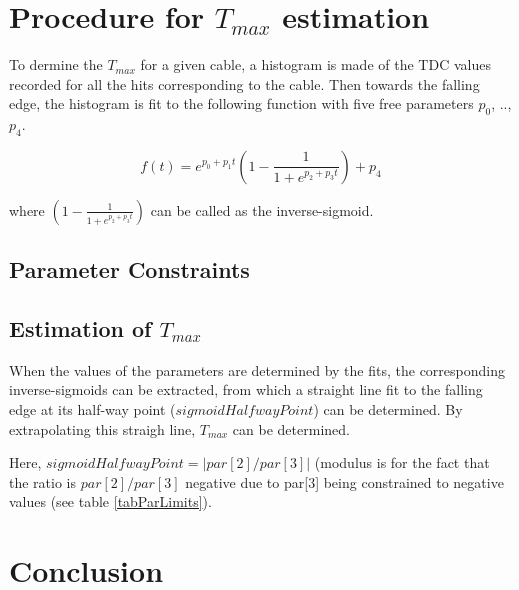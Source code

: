 \documentclass[12pt,epsfig]{article}
\def\tmax{$T_{max}$ }
\begin{document}
\section{Procedure for \tmax estimation}
To dermine the \tmax for a given cable, a histogram is made of the TDC values recorded for all the hits corresponding to the cable. Then towards the falling edge, the histogram is fit to the following function with five free parameters $p_0$, .., $p_4$.

\begin{equation}
    \label{T0fit}
    f(t) = e^{p_0 + p_1t} (1 - \frac{1}{1 + e^{p_2 + p_3t}})  + p_4
\end{equation}

where $(1 - \frac{1}{1 + e^{p_2 + p_3t}})$ can be called as the inverse-sigmoid.


\subsection{Parameter Constraints}



\subsection{Estimation of \tmax}

When the values of the parameters are determined by the fits, the corresponding inverse-sigmoids 
can be extracted, from which a straight line fit to the falling edge at its half-way point ($sigmoidHalfwayPoint$)
can be determined. By extrapolating this straigh line, \tmax can be determined.

Here, $sigmoidHalfwayPoint = |par[2]/par[3]|$ (modulus is for the fact that the ratio is 
$par[2]/par[3]$ negative due to par[3] being constrained to negative values (see 
table \ref{tabParLimits}).



\section{Conclusion}



\appendix
\appendixpage
\end{document}
